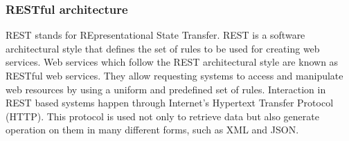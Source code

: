 \subsubsection{RESTful architecture}
REST stands for REpresentational State Transfer. REST is a software architectural style that defines the set of rules to be used for creating web services. Web services which follow the REST architectural style are known as RESTful web services. They allow requesting systems to access and manipulate web resources by using a uniform and predefined set of rules. Interaction in REST based systems happen through Internet’s Hypertext Transfer Protocol (HTTP). This protocol is used not only to retrieve data but also generate operation on them in many different forms, such as XML and JSON.



